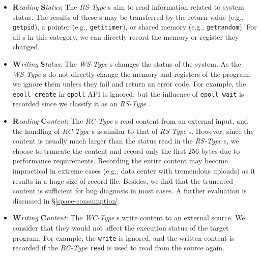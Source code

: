 \begin{itemize}
\item
\noindent\textbf{R}\textit{eading} \textbf{S}\textit{tatus}: 
The \textit{RS-Type} \syscall{}s
aim to read information related to system status. The results of
these \syscall{}s may be transferred by the return value (e.g., \texttt{getpid}), 
a pointer (e.g., \texttt{getitimer}), or shared memory (e.g.,
\texttt{getrandom}). For all \syscall{}s
in this category, we can directly record the memory or register they changed.

\item
\noindent\textbf{W}\textit{riting} \textbf{S}\textit{tatus}: 
The \textit{WS-Type} \syscall{}s
changes the status of the system. As the \textit{WS-Type} \syscall{}s do not
directly change the memory and registers of the program, we ignore
them unless they fail and return an error code. 
For example, the \syscall{} \texttt{epoll\_create} in \texttt{epoll} API
is ignored, but the influence of \syscall{} \texttt{epoll\_wait} is
recorded since we classify it as an \textit{RS-Type} \syscall{}.


\item
\noindent\textbf{R}\textit{eading} \textbf{C}\textit{ontent}: 
The \textit{RC-Type} \syscall{}s read content from an external input, and the
handling of \textit{RC-Type} \syscall{}s is similar to that of \textit{RS-Type} 
\syscall{}s. However, since the content is usually much larger than
the status read in the \textit{RS-Type} \syscall{}s, we choose to
truncate the content and record only the first 256 bytes due to
performance requirements. Recording the entire content may become
impractical in extreme cases (e.g., data center with tremendous
uploads) as it results in a huge size of record file. 
Besides, we find that the truncated content is sufficient for bug diagnosis in
most cases. A further evaluation is discussed in
\S \ref{space-consumption}.

\item
\noindent\textbf{W}\textit{riting} \textbf{C}\textit{ontent}:
The \textit{WC-Type} \syscall{}s write content to an external source. We 
consider that they would not affect the execution status of the target
program. For example, the \syscall{} \texttt{write} is ignored, and
the written content is recorded if the \textit{RC-Type} \syscall{}
\texttt{read} is used to read from the source again.
\end{itemize}



